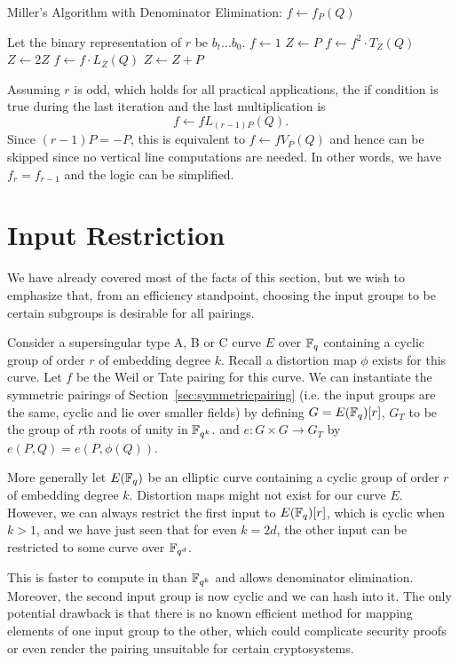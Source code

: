 \begin{algorithm}
\caption {Miller's Algorithm with Denominator Elimination: $f \gets f_P(Q)$}
\begin{algorithmic}[1]
\STATE Let the binary representation of $r$ be $b_t ... b_0$.
\STATE $f \gets 1$
\STATE $Z \gets P$
    \STATE $f \gets f^2 \cdot T_Z(Q)$
    \STATE $Z \gets 2Z$
	\STATE $f \gets f \cdot L_Z(Q)$
	\STATE $Z \gets Z + P$
    \ENDIF
\ENDFOR
\end{algorithmic}
\end{algorithm}

Assuming $r$ is odd, which holds for all practical applications,
the if condition is true during the last iteration and
the last multiplication is
\[ f \leftarrow f L_{(r-1)P}(Q) .\]
Since $(r-1)P = -P$, this is equivalent to $f \leftarrow f V_P(Q)$
and hence can be skipped since no vertical line computations are needed.
In other words, we have $f_r = f_{r-1}$ and the logic can be simplified.

\section {\label{sec:inputrestriction}Input Restriction}

We have already covered most of the facts of this section, but we wish
to emphasize that, from an efficiency standpoint, choosing the input
groups to be certain subgroups is desirable for all pairings.

Consider a supersingular type A, B or C curve $E$ over $\mathbb{F}_q$ containing
a cyclic group of order $r$ of embedding degree $k$. Recall
a distortion map $\phi$ exists for this curve.
Let $f$ be the Weil or Tate pairing for this
curve.
We can instantiate the symmetric pairings of Section~\ref{sec:symmetricpairing}
(i.e. the input groups are the same, cyclic and lie over smaller fields)
by defining $G = E(\mathbb{F}_q)[r]$,
$G_T$ to be the group of $r$th roots of unity in $\mathbb{F}_{q^k}$.
and $e : G \times G \rightarrow G_T$ by
$e(P,Q) = e(P, \phi(Q))$.

More generally let $E(\mathbb{F}_q)$ be an elliptic curve containing a cyclic
group of order $r$ of embedding degree $k$.
Distortion maps might not exist for our curve $E$.
However, we can always restrict the first input to $E(\mathbb{F}_q)[r]$,
which is cyclic when $k > 1$,
and we have just seen that for even $k = 2d$,
the other input can be restricted to some curve over $\mathbb{F}_{q^d}$.

This is faster to compute in than $\mathbb{F}_{q^k}$ and allows denominator
elimination. Moreover, the second input group is now cyclic and we can hash
into it. The only potential drawback is that there is no known efficient method
for mapping elements of one input group to the other, which could complicate
security proofs or even render the pairing unsuitable for certain
cryptosystems.

